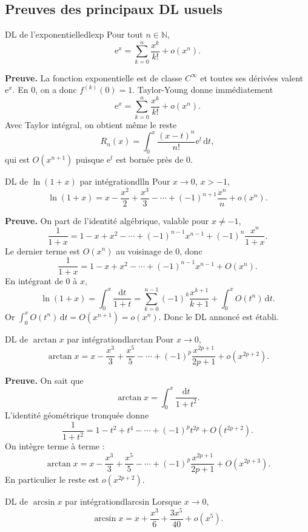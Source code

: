 \documentclass[11pt,a4paper]{article}
\newcommand{\N}{\mathbb{N}}
\newcommand{\e}{\mathrm{e}}
\newcommand{\dd}{\mathrm{d}}
\begin{document}
\subsection{Preuves des principaux DL usuels}

\begin{examplebox}{DL de l'exponentielle}{dlexp}
Pour tout $n\in\N$,
\[
  \e^x=\sum_{k=0}^n\frac{x^k}{k!}+o(x^n).
\]
\end{examplebox}

\textbf{Preuve.} La fonction exponentielle est de classe $C^\infty$ et toutes ses dérivées valent $\e^x$. En $0$, on a donc $f^{(k)}(0)=1$. Taylor-Young donne immédiatement
\[
  \e^x=\sum_{k=0}^n \frac{x^k}{k!}+o(x^n).
\]
Avec Taylor intégral, on obtient même le reste
\[
  R_n(x)=\int_0^x \frac{(x-t)^n}{n!}\e^t\,\dd t,
\]
qui est $O(x^{n+1})$ puisque $\e^t$ est bornée près de $0$.

\begin{examplebox}{DL de $\ln(1+x)$ par intégration}{dlln}
Pour $x\to0$, $x>-1$,
\[
  \ln(1+x)=x-\frac{x^2}{2}+\frac{x^3}{3}-\cdots+(-1)^{n+1}\frac{x^n}{n}+o(x^n).
\]
\end{examplebox}

\textbf{Preuve.} On part de l'identité algébrique, valable pour $x\ne-1$,
\[
  \frac1{1+x}=1-x+x^2-\cdots+(-1)^{n-1}x^{n-1}+(-1)^n\frac{x^n}{1+x}.
\]
Le dernier terme est $O(x^n)$ au voisinage de $0$, donc
\[
  \frac1{1+x}=1-x+x^2-\cdots+(-1)^{n-1}x^{n-1}+O(x^n).
\]
En intégrant de $0$ à $x$,
\[
  \ln(1+x)=\int_0^x\frac{\dd t}{1+t}
  =\sum_{k=0}^{n-1}(-1)^k\frac{x^{k+1}}{k+1}+\int_0^x O(t^n)\,\dd t.
\]
Or $\int_0^x O(t^n)\,\dd t=O(x^{n+1})=o(x^n)$. Donc le DL annoncé est établi.

\begin{examplebox}{DL de $\arctan x$ par intégration}{dlarctan}
Pour $x\to0$,
\[
  \arctan x=x-\frac{x^3}{3}+\frac{x^5}{5}-\cdots+(-1)^p\frac{x^{2p+1}}{2p+1}+o(x^{2p+2}).
\]
\end{examplebox}

\textbf{Preuve.} On sait que
\[
  \arctan x=\int_0^x \frac{\dd t}{1+t^2}.
\]
L'identité géométrique tronquée donne
\[
  \frac1{1+t^2}=1-t^2+t^4-\cdots+(-1)^p t^{2p}+O(t^{2p+2}).
\]
On intègre terme à terme :
\[
  \arctan x=x-\frac{x^3}{3}+\frac{x^5}{5}-\cdots+(-1)^p\frac{x^{2p+1}}{2p+1}+O(x^{2p+3}).
\]
En particulier le reste est $o(x^{2p+2})$.

\begin{examplebox}{DL de $\arcsin x$ par intégration}{dlarcsin}
Lorsque $x\to0$,
\[
  \arcsin x=x+\frac{x^3}{6}+\frac{3x^5}{40}+o(x^5).
\]
\end{examplebox}
\end{document}
